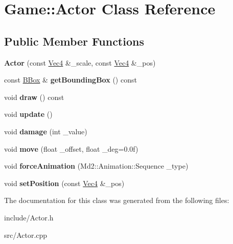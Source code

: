 \hypertarget{classGame_1_1Actor}{\section{Game\-:\-:Actor Class Reference}
\label{classGame_1_1Actor}
}
\subsection*{Public Member Functions}
\begin{DoxyCompactItemize}
\item 
\hypertarget{classGame_1_1Actor_a01474cf0b2473a7b33e739879e699744}{{\bfseries Actor} (const \hyperlink{classVec4}{Vec4} \&\-\_\-scale, const \hyperlink{classVec4}{Vec4} \&\-\_\-pos)}\label{classGame_1_1Actor_a01474cf0b2473a7b33e739879e699744}

\item 
\hypertarget{classGame_1_1Actor_a37bd47622e9c48084dcfe972bb3f4f97}{const \hyperlink{classGame_1_1BBox}{B\-Box} \& {\bfseries get\-Bounding\-Box} () const }\label{classGame_1_1Actor_a37bd47622e9c48084dcfe972bb3f4f97}

\item 
\hypertarget{classGame_1_1Actor_acef153bbbceb4e50a074709ebb9b9d6e}{void {\bfseries draw} () const }\label{classGame_1_1Actor_acef153bbbceb4e50a074709ebb9b9d6e}

\item 
\hypertarget{classGame_1_1Actor_afdfc0146b9803d01df603e1a6407addc}{void {\bfseries update} ()}\label{classGame_1_1Actor_afdfc0146b9803d01df603e1a6407addc}

\item 
\hypertarget{classGame_1_1Actor_a4ec49b78d5725c49cc485147aac78c23}{void {\bfseries damage} (int \-\_\-value)}\label{classGame_1_1Actor_a4ec49b78d5725c49cc485147aac78c23}

\item 
\hypertarget{classGame_1_1Actor_a7be1368674da4e04e04317b1c66cc352}{void {\bfseries move} (float \-\_\-offset, float \-\_\-deg=0.\-0f)}\label{classGame_1_1Actor_a7be1368674da4e04e04317b1c66cc352}

\item 
\hypertarget{classGame_1_1Actor_af4b23b2b2e1c9372b5e52a889c1f34fe}{void {\bfseries force\-Animation} (Md2\-::\-Animation\-::\-Sequence \-\_\-type)}\label{classGame_1_1Actor_af4b23b2b2e1c9372b5e52a889c1f34fe}

\item 
\hypertarget{classGame_1_1Actor_afd78ea4be719da0df1615fe319cadb06}{void {\bfseries set\-Position} (const \hyperlink{classVec4}{Vec4} \&\-\_\-pos)}\label{classGame_1_1Actor_afd78ea4be719da0df1615fe319cadb06}

\end{DoxyCompactItemize}


The documentation for this class was generated from the following files\-:\begin{DoxyCompactItemize}
\item 
include/Actor.\-h\item 
src/Actor.\-cpp\end{DoxyCompactItemize}
